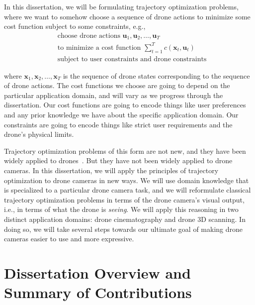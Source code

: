 \noindent In this dissertation, we will be formulating trajectory optimization problems, where we want to somehow choose a sequence of drone actions to minimize some cost function subject to some constraints, e.g.,
~
\begin{equation*}
\begin{aligned}
& \text{choose drone actions } \mathbf{u}_1, \mathbf{u}_2, \ldots, \mathbf{u}_T\\
& \text{to minimize a cost function } \sum_{t=1}^T c( \mathbf{x}_t, \mathbf{u}_t)\\
& \text{subject to user constraints and drone constraints}
\end{aligned}
\end{equation*}

\noindent where $\mathbf{x}_1, \mathbf{x}_2, \ldots, \mathbf{x}_T$ is the sequence of drone states corresponding to the sequence of drone actions.
The cost functions we choose are going to depend on the particular application domain, and will vary as we progress through the dissertation.
Our cost functions are going to encode things like user preferences and any prior knowledge we have about the specific application domain.
Our constraints are going to encode things like strict user requirements and the drone's physical limits.

Trajectory optimization problems of this form are not new, and they have been widely applied to drones~\cite{kumar:2012}.
But they have not been widely applied to drone cameras.
In this dissertation, we will apply the principles of trajectory optimization to drone cameras in new ways.
We will use domain knowledge that is specialized to a particular drone camera task, and we will reformulate classical trajectory optimization problems in terms of the drone camera's visual output, i.e., in terms of what the drone is \emph{seeing}.
We will apply this reasoning in two distinct application domains: drone cinematography and drone 3D scanning.
In doing so, we will take several steps towards our ultimate goal of making drone cameras easier to use and more expressive.

\section{Dissertation Overview and Summary of Contributions}

